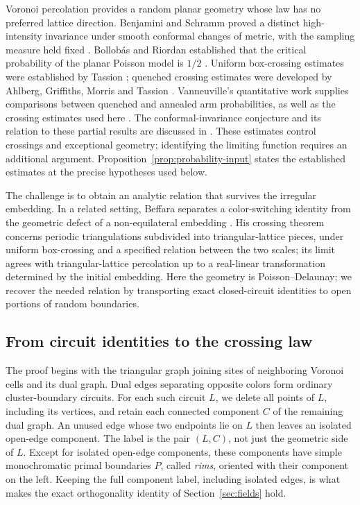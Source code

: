 Voronoi percolation provides a random planar geometry whose law has no
preferred lattice direction. Benjamini and Schramm proved a distinct
high-intensity invariance under smooth conformal changes of metric,
with the sampling measure held fixed \cite{BenjaminiSchramm1998}.
Bollob\'as and Riordan established that the critical probability of the
planar Poisson model is $1/2$ \cite{BollobasRiordan2006}.
Uniform box-crossing estimates were established by Tassion \cite{Tassion2016};
quenched crossing estimates were developed by
Ahlberg, Griffiths, Morris and Tassion \cite{AGMT2016}.
Vanneuville's quantitative work supplies comparisons between quenched
and annealed arm probabilities, as well as the crossing estimates used
here \cite{Vanneuville2025}. The conformal-invariance conjecture and its
relation to these partial results are discussed in
\cite[Section~1.2]{Vanneuville2021}. These estimates control crossings and
exceptional geometry; identifying the limiting function requires an
additional argument. Proposition~\ref{prop:probability-input} states the
established estimates at the precise hypotheses used below.

The challenge is to obtain an analytic relation that survives the
irregular embedding. In a related setting, Beffara separates a
color-switching identity from the geometric defect of a non-equilateral
embedding \cite[Sections~3.2--3.3, equations~(13)--(14)]{Beffara2014Mesoscopic}.
His crossing theorem concerns periodic triangulations subdivided into
triangular-lattice pieces, under uniform box-crossing and a specified
relation between the two scales; its limit agrees with triangular-lattice
percolation up to a real-linear transformation determined by the initial
embedding. Here the geometry is Poisson--Delaunay;
we recover the needed relation by transporting exact closed-circuit
identities to open portions of random boundaries.

\subsection{From circuit identities to the crossing law}

The proof begins with the triangular graph joining sites of neighboring
Voronoi cells and its dual graph. Dual edges separating opposite colors
form ordinary cluster-boundary circuits. For each such circuit $L$, we
delete all points of $L$, including its vertices, and retain each
connected component $C$ of the remaining dual graph. An unused edge whose two endpoints lie
on $L$ then leaves an isolated open-edge component. The label is the
pair $(L,C)$, not just the
geometric side of $L$. Except for isolated open-edge components, these
components have simple monochromatic primal boundaries $P$, called
\emph{rims}, oriented with their component on the left. Keeping the full
component label, including isolated edges, is what makes the exact
orthogonality identity of Section~\ref{sec:fields} hold.

